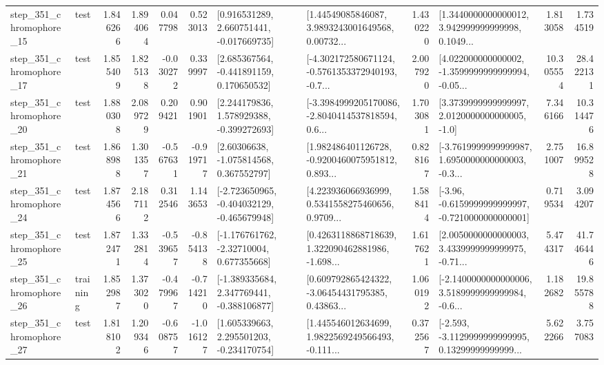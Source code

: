 \begin{tabular}{llrrrrllrlrr}
  step\_351\_chromophore\_15 &      test &      1.846266 &    1.894064 &      0.047798 &  0.523013 &    [0.916531289, 2.660751441, -0.017669735] &  [1.44549085846087, 3.9893243001649568, 0.00732... &       1.430220 &  [1.3440000000000012, 3.942999999999998, 0.1049... &            1.813058 &          1.734519 \\
  step\_351\_chromophore\_17 &      test &      1.855409 &    1.825138 &     -0.030272 &  0.339997 &    [2.685367564, -0.441891159, 0.170650532] &  [-4.302172580671124, -0.5761353372940193, -0.7... &       2.007920 &  [4.022000000000002, -1.3599999999999994, -0.05... &           10.305554 &         28.422131 \\
  step\_351\_chromophore\_20 &      test &      1.880308 &    2.089729 &      0.209421 &  0.901901 &    [2.244179836, 1.578929388, -0.399272693] &  [-3.3984999205170086, -2.8040414537818594, 0.6... &       1.703081 &     [3.3739999999999997, 2.0120000000000005, -1.0] &            7.346166 &         10.314476 \\
  step\_351\_chromophore\_21 &      test &      1.868988 &    1.301357 &     -0.567631 & -0.919717 &     [2.60306638, -1.075814568, 0.367552797] &  [1.982486401126728, -0.9200460075951812, 0.893... &       0.828167 &  [-3.7619999999999987, 1.6950000000000003, -0.3... &            2.751007 &         16.899528 \\
  step\_351\_chromophore\_24 &      test &      1.874566 &    2.187112 &      0.312546 &  1.143653 &  [-2.723650965, -0.404032129, -0.465679948] &  [4.223936066936999, 0.5341558275460656, 0.9709... &       1.588414 &  [-3.96, -0.6159999999999997, -0.7210000000000001] &            0.719534 &          3.094207 \\
  step\_351\_chromophore\_25 &      test &      1.872471 &    1.332814 &     -0.539657 & -0.854138 &    [-1.176761762, -2.32710004, 0.677355668] &  [0.4263118868718639, 1.322090462881986, -1.698... &       1.617621 &  [2.0050000000000003, 3.4339999999999975, -0.71... &            5.474317 &         41.746446 \\
  step\_351\_chromophore\_26 &  training &      1.852987 &    1.373020 &     -0.479967 & -0.714210 &   [-1.389335684, 2.347769441, -0.388106877] &  [0.609792865424322, -3.06454431795385, 0.43863... &       1.060192 &  [-2.1400000000000006, 3.5189999999999984, -0.6... &            1.182682 &         19.855788 \\
  step\_351\_chromophore\_27 &      test &      1.818102 &    1.209346 &     -0.608757 & -1.016127 &    [1.605339663, 2.295501203, -0.234170754] &  [1.445546012634699, 1.9822569249566493, -0.111... &       0.372567 &  [-2.593, -3.1129999999999995, 0.13299999999999... &            5.622266 &          3.757083 \\

\end{tabular}
